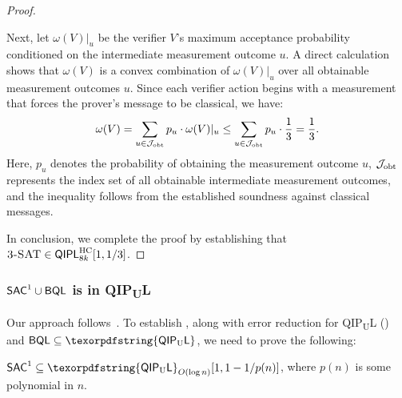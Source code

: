\documentclass[11pt, a4paper]{article}
\numberwithin{equation}{section}
\numberwithin{figure}{section}
\newcommand{\QIPL}{\textnormal{\textsf{QIPL}}\xspace}
\newcommand{\QIPUL}{\texorpdfstring{\textnormal{\textsf{QIP}\textsubscript{\textnormal{U}}\textsf{L}}}\xspace}
\newcommand{\HC}{\mathrm{HC}}
\newcommand{\BQL}{\textnormal{\textsf{BQL}}\xspace}
\newcommand{\SAC}{\textnormal{\textsf{SAC}}\xspace}
\newcommand{\threeSAT}{\textnormal{\textsc{3-SAT}}\xspace}
\newcommand{\calJ}{\mathcal{J}}
\begin{document}
\begin{proof}
\begin{itemize}
        Next, let $\omega(V)|_u$ be the verifier $V$'s maximum acceptance probability conditioned on the intermediate measurement outcome $u$. A direct calculation shows that $\omega(V)$ is a convex combination of $\omega(V)|_u$ over all obtainable measurement outcomes $u$. Since each verifier action begins with a measurement that forces the prover's message to be classical, we have: 
        \[ \omega(V) = \sum_{u \in \calJ_{\rm obt}} p_u \cdot \omega(V)|_u \leq \sum_{u \in \calJ_{\rm obt}} p_u \cdot \frac{1}{3} = \frac{1}{3}. \]
        Here, $p_u$ denotes the probability of obtaining the measurement outcome $u$, $\calJ_{\rm obt}$ represents the index set of all obtainable intermediate measurement outcomes, and the inequality follows from the established soundness against classical messages. 
    \end{itemize}
    In conclusion, we complete the proof by establishing that $\threeSAT \in \QIPL^\HC_{8k}[1,1/3]$. 
\end{proof}

\subsubsection{\texorpdfstring{$\SAC^1 \cup \BQL$ is in \QIPUL{}}{}}
\label{subsubsec:LOGCFL-in-QIPUL}

Our approach follows~\cite[Section 3.4]{Fortnow89}. To establish , along with error reduction for \QIPUL{} () and $\BQL \subseteq \QIPUL$, we need to prove the following: 

\begin{lemma}
    \label{thm:LOGCFP-in-QIPUL-weakErrorBound}
    $\SAC^1 \subseteq \QIPUL_{O(\log{n})}[1,1-1/p(n)]$, where $p(n)$ is some polynomial in $n$.
\end{lemma}
\end{document}
